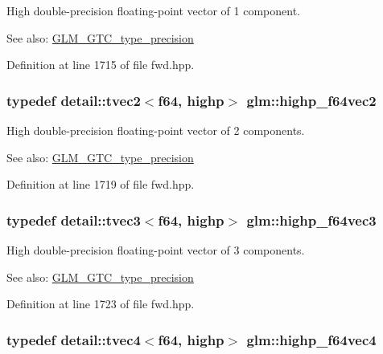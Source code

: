 High double-precision floating-point vector of 1 component. \begin{Desc}
\item[See also:]\hyperlink{group__gtc__type__precision}{GLM\_\-GTC\_\-type\_\-precision} \end{Desc}


Definition at line 1715 of file fwd.hpp.\hypertarget{group__gtc__type__precision_g1efd4982eaeafae59ce40deb89e018e7}{
\subsubsection[highp\_\-f64vec2]{\setlength{\rightskip}{0pt plus 5cm}typedef detail::tvec2$<$f64, highp$>$ {\bf glm::highp\_\-f64vec2}}}
\label{group__gtc__type__precision_g1efd4982eaeafae59ce40deb89e018e7}


High double-precision floating-point vector of 2 components. \begin{Desc}
\item[See also:]\hyperlink{group__gtc__type__precision}{GLM\_\-GTC\_\-type\_\-precision} \end{Desc}


Definition at line 1719 of file fwd.hpp.\hypertarget{group__gtc__type__precision_g93cbac95bb9106fe15c987c0f56ae679}{
\subsubsection[highp\_\-f64vec3]{\setlength{\rightskip}{0pt plus 5cm}typedef detail::tvec3$<$f64, highp$>$ {\bf glm::highp\_\-f64vec3}}}
\label{group__gtc__type__precision_g93cbac95bb9106fe15c987c0f56ae679}


High double-precision floating-point vector of 3 components. \begin{Desc}
\item[See also:]\hyperlink{group__gtc__type__precision}{GLM\_\-GTC\_\-type\_\-precision} \end{Desc}


Definition at line 1723 of file fwd.hpp.\hypertarget{group__gtc__type__precision_g1e9d8145fb9521701a5eeb6df5754184}{
\subsubsection[highp\_\-f64vec4]{\setlength{\rightskip}{0pt plus 5cm}typedef detail::tvec4$<$f64, highp$>$ {\bf glm::highp\_\-f64vec4}}}
\label{group__gtc__type__precision_g1e9d8145fb9521701a5eeb6df5754184}


